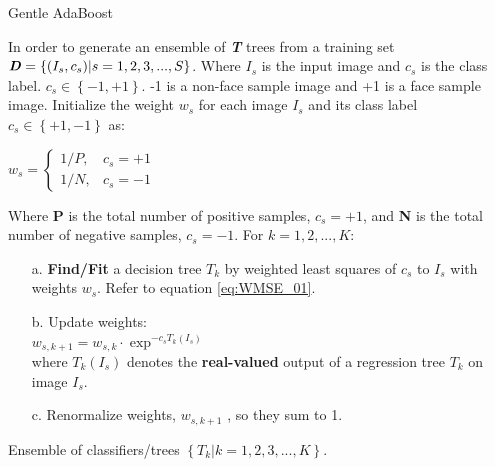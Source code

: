 \documentclass[a4paper,12pt]{article}
\begin{document}
\begin{algorithm}[htb]
  \caption{ Gentle AdaBoost}
  \label{alg:GentleAdaBoost}
  \begin{algorithmic}[1]
    \Require
	In order to generate an ensemble of \textbf{\textit{T}} trees from a training set 	$\textbf{\textit{D}}=\left\{ { (I_s,c_s) | s=1,2,3,...,S}\right\}$. Where $I_s$ is the input image and $c_s$ is the class label. $c_s \in \left\{{-1,+1 } \right\}$. -1 is a non-face sample image and +1 is a face sample image.
    \State Initialize the weight $w_s$ for each image $I_s$ and its class label $c_s \in
    	\left\{ {+1,-1}\right\}$ as:

    $w_s=
	\begin{cases}
    1/P,	& c_s = +1 \\
    1/N,    & c_s = -1
	\end{cases}$

		Where \textbf{P} is the total number of positive samples, $c_s=+1$, and \textbf{N} is the total number
		of negative samples, $c_s=-1$.
    \State For $k = 1,2,...,K:$
    \begin{itemize}
	\item[a.]{\textbf{Find/Fit} a decision tree $T_k$ by weighted least squares of $c_s$ to $I_s$ with
	weights $w_s$}. Refer to equation \eqref{eq:WMSE_01}.
	\item[b.]{Update weights:}\\
		$w_{s,k+1} = w_{s,k} \cdot \exp^{-c_s T_k(I_s)}$\\
		where $T_k(I_s)$ denotes the \textbf{real-valued} output of a regression tree $T_k$ on image $I_s$.
	\item[c.]{Renormalize weights, $w_{s,k+1}$ , so they sum to 1.}
	\end{itemize}
    \Ensure
      Ensemble of classifiers/trees $\left\{ { T_k | k=1,2,3,...,K}\right\}$.
  \end{algorithmic}
\end{algorithm}
\end{document}
